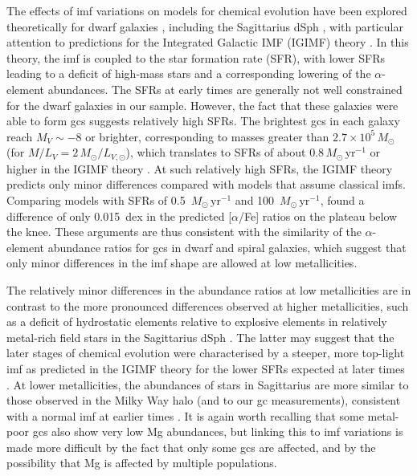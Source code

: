 \documentclass{aa}
\begin{document}
The effects of \ac{imf} variations on models for chemical evolution have been explored theoretically for dwarf galaxies \citep{Recchi2014}, including the Sagittarius dSph \citep{Vincenzo2015}, with particular attention to predictions for the Integrated Galactic IMF (IGIMF) theory \citep{Weidner2005}.  In this theory, the \ac{imf} is coupled to the star formation rate (SFR), with lower SFRs leading to a deficit of high-mass stars and a corresponding lowering of the $\alpha$-element abundances. The SFRs at early times are generally not well constrained for the dwarf galaxies in our sample. However, the fact that these galaxies were able to form \acp{gc} suggests relatively high SFRs. The brightest \acp{gc} in each galaxy reach $M_V\sim-8$ or brighter, corresponding to masses greater than $2.7\times10^5 \, M_\odot$ (for $M/L_V = 2 \, M_\odot/L_{V,\odot}$), which translates to SFRs of about $0.8 \, M_\odot \, \mathrm{yr}^{-1}$ or higher in the IGIMF theory \citep{Vincenzo2015}. At such relatively high SFRs, the IGIMF theory predicts only minor differences compared with models that assume classical \acp{imf}. Comparing models with SFRs of 0.5~$M_\odot \, \mathrm{yr}^{-1}$  and 100~$M_\odot \, \mathrm{yr}^{-1}$, \citet{Recchi2014} found a difference of only 0.015~dex in the predicted [$\alpha$/Fe] ratios on the plateau below the knee. 
These arguments are thus consistent with the similarity of the $\alpha$-element abundance ratios for \acp{gc} in dwarf and spiral galaxies, which suggest that only minor differences in the \ac{imf} shape are allowed at low metallicities.

The relatively minor differences in the abundance ratios at low metallicities are in contrast to the more pronounced differences observed at higher metallicities, such as a deficit of hydrostatic elements relative to explosive elements in relatively metal-rich field stars in the Sagittarius dSph \citep{McWilliam2013}. The latter may suggest that the later stages of chemical evolution were characterised by a steeper, more top-light \ac{imf} as predicted in the IGIMF theory for the lower SFRs expected at later times \citep{Vincenzo2015}. 
At lower metallicities, the abundances of stars in Sagittarius are more similar to those observed in the Milky Way halo (and to our \ac{gc} measurements), consistent with a normal \ac{imf} at earlier times \citep{Hansen2018}.
It is again worth recalling that some metal-poor \acp{gc} also show very low Mg abundances, but linking this to \ac{imf} variations is made more difficult by the fact that only some \acp{gc} are affected, and by the possibility that Mg is affected by multiple populations. 
\end{document}

